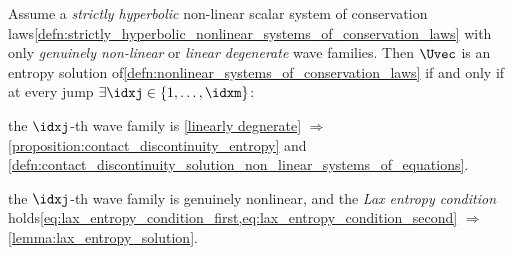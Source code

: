 \begin{lemmabox}\nospacing
    \begin{lemma}
        Assume a \textit{strictly hyperbolic} non-linear scalar system of conservation laws\cref{defn:strictly_hyperbolic_nonlinear_systems_of_conservation_laws} with only \textit{genuinely non-linear} or \textit{linear degenerate} wave families.
        Then $\Uvec$ is an entropy solution of\cref{defn:nonlinear_systems_of_conservation_laws} if and only if at every jump $\exists\idxj\in\{1,\ldots,\idxm\}$:
        \begin{itemizenosep}
            \item the $\idxj$-th wave family is \cref{linearly degnerate} $\Rightarrow$ \cref{proposition:contact_discontinuity_entropy} and \cref{defn:contact_discontinuity_solution_non_linear_systems_of_equations}.
            \item the $\idxj$-th wave family is genuinely nonlinear, and the \textit{Lax entropy condition} holds\cref{eq:lax_entropy_condition_first,eq:lax_entropy_condition_second} $\Rightarrow$ \cref{lemma:lax_entropy_solution}.
        \end{itemizenosep}
    \end{lemma}
\end{lemmabox}


